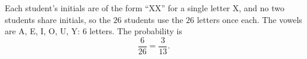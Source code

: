 Each student's initials are of the form ``XX'' for a single letter X, and no two students share initials, so the $26$ students use the $26$ letters once each. The vowels are A, E, I, O, U, Y: $6$ letters. The probability is
\[
\dfrac{6}{26}=\boxed{\dfrac{3}{13}} .
\]
